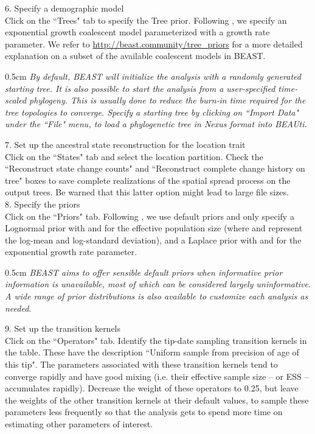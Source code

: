 \documentclass{article}
\newcommand{\ann}[1]{
\begin{adjustwidth}{0.5cm}{}
\it{#1}\\
\end{adjustwidth}}
\newcommand{\code}[1]{
{\upshape\ttfamily{#1}}}
\begin{document}
6. Specify a demographic model\\

Click on the ``Trees" tab to specify the Tree prior. Following \cite{travhist}, we specify an exponential growth coalescent model parameterized with a growth rate parameter.
We refer to \url{http://beast.community/tree_priors} for a more detailed explanation on a subset of the available coalescent models in BEAST. \\

\ann{By default, BEAST will initialize the analysis with a randomly generated starting tree. It is also possible to start the analysis from a user-specified time-scaled phylogeny. This is usually done to reduce the burn-in time required for the tree topologies to converge. Specify a starting tree by clicking on ``Import Data" under the ``File" menu, to load a phylogenetic tree in Nexus format into BEAUti.}

7. Set up the ancestral state reconstruction for the location trait\\

Click on the ``States" tab and select the location partition. 
Check the ``Reconstruct state change counts" and ``Reconstruct complete change history on tree" boxes to save complete realizations of the spatial spread process on the output trees.
Be warned that this latter option might lead to large file sizes.\\

8. Specify the priors \\

Click on the ``Priors" tab. Following \cite{travhist}, we use default priors and only specify a Lognormal prior with \code{mu=0} and \code{sigma=10} for the effective population size (where\code{mu} and \code{sigma} represent the log-mean and log-standard deviation), and a Laplace prior with \code{mean=0} and \code{scale=100} for the exponential growth rate parameter.\\ %

\ann{BEAST aims to offer sensible default priors when informative prior information is unavailable, most of which can be considered largely uninformative. A wide range of prior distributions is also available to customize each analysis as needed.}

9. Set up the transition kernels \\

Click on the ``Operators" tab. Identify the tip-date sampling transition kernels in the table.
These have the description ``Uniform sample from precision of age of this tip".
The parameters associated with these transition kernels tend to converge rapidly and have good mixing (i.e. their effective sample size -- or ESS -- accumulates rapidly).
Decrease the weight of these operators to 0.25, but leave the weights of the other transition kernels at their default values, to sample these parameters less frequently so that the analysis gets to spend more time on estimating other parameters of interest.\\
\end{document}
